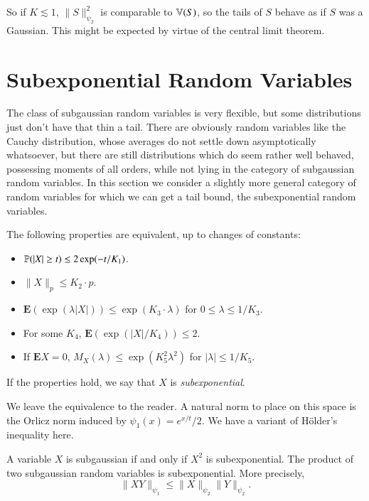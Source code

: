 So if $K \lesssim 1$, $\| S \|_{\psi_2}^2$ is comparable to $\operatorname{\mathbb{V}}(S)$, so the tails of $S$ behave as if $S$ was a Gaussian. This might be expected by virtue of the central limit theorem.






\section{Subexponential Random Variables}

The class of subgaussian random variables is very flexible, but some distributions just don't have that thin a tail. There are obviously random variables like the Cauchy distribution, whose averages do not settle down asymptotically whatsoever, but there are still distributions which do seem rather well behaved, possessing moments of all orders, while not lying in the category of subgaussian random variables. In this section we consider a slightly more general category of random variables for which we can get a tail bound, the subexponential random variables.

\begin{theorem}
    The following properties are equivalent, up to changes of constants:
    \begin{itemize}
        \item $\operatorname{\mathbb{P}}(|X| \geq t) \leq 2 \exp(-t/K_1)$.
        \item $\| X \|_p \leq K_2 \cdot p$.
        \item $\mathbf{E}(\exp(\lambda |X|)) \leq \exp(K_3 \cdot \lambda)$ for $0 \leq \lambda \leq 1/K_3$.
        \item For some $K_4$, $\mathbf{E}(\exp(|X|/K_4)) \leq 2$.
        \item If $\mathbf{E} X = 0$, $M_X(\lambda) \leq \exp(K_5^2 \lambda^2)$ for $|\lambda| \leq 1/K_5$.
    \end{itemize}
    If the properties hold, we say that $X$ is \emph{subexponential}.
\end{theorem}

We leave the equivalence to the reader. A natural norm to place on this space is the Orlicz norm induced by $\psi_1(x) = e^{x/t}/2$. We have a variant of H\"{o}lder's inequality here.

\begin{lemma}
    A variable $X$ is subgaussian if and only if $X^2$ is subexponential. The product of two subgaussian random variables is subexponential. More precisely,
    \[ \| X Y \|_{\psi_1} \leq \| X \|_{\psi_2} \| Y \|_{\psi_2}. \]
\end{lemma}

